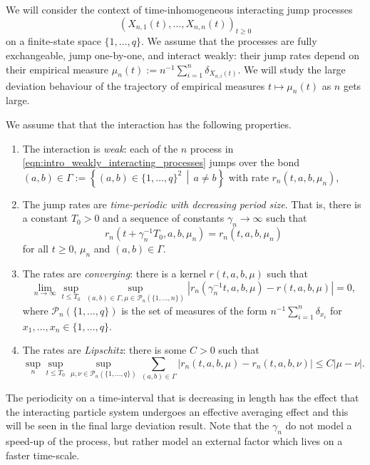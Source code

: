 \documentclass[a4paper]{article}
\newcommand{\cP}{\mathcal{P}}
\numberwithin{equation}{section}
\theoremstyle{definition}
\begin{document}
We will consider the context of time-inhomogeneous interacting jump processes 
\begin{equation} \label{eqn:intro_weakly_interacting_processes}
	(X_{n,1}(t),\dots,X_{n,n}(t))_{t \geq 0}
\end{equation} 
on a finite-state space $\{1,\dots,q\}$. We assume that the processes are fully exchangeable, jump one-by-one, and interact weakly: their jump rates depend on their empirical measure $\mu_n(t) := n^{-1} \sum_{i=1}^n \delta_{X_{n,i}(t)}$.  We will study the large deviation behaviour of the trajectory of empirical measures $t \mapsto \mu_n(t)$ as $n$ gets large.




We assume that that the interaction has the following properties.
\begin{enumerate}[(1)]
	\item \label{item:intro_weak_interaction}The interaction is \textit{weak}: each of the $n$ process in \eqref{eqn:intro_weakly_interacting_processes} jumps over the bond $(a,b) \in \Gamma := \left\{(a,b) \in \{1,\dots,q\}^2 \, \middle| \, a \neq b\right\}$ with rate $r_n(t,a,b,\mu_n)$,
	\item \label{item:intro_time_periodic} The jump rates are \textit{time-periodic with decreasing period size}. That is, there is a constant $T_0 > 0$ and a sequence of constants $\gamma_n \rightarrow \infty$ such that 
	\begin{equation*}
		r_n(t + \gamma_n^{-1}T_0,a,b,\mu_n) = r_n(t,a,b,\mu_n)
	\end{equation*}
	for all $t \geq 0$, $\mu_n$ and $(a,b) \in \Gamma$. 
	\item \label{item:intro_convergence} The rates are \textit{converging}: there is a kernel $r(t,a,b,\mu)$ such that 
	\begin{equation*}
		\lim_{n \rightarrow \infty} \sup_{t \leq T_0} \sup_{(a,b) \in \Gamma, \mu \in \cP_n(\{1,\dots,n\})} \left|r_n(\gamma_n^{-1}t, a,b,\mu) - r(t,a,b,\mu) \right| = 0,
	\end{equation*}
	where $\cP_n(\{1,\dots,q\})$ is the set of measures of the form $n^{-1} \sum_{i = 1}^n \delta_{x_i}$ for $x_1,\dots,x_n \in \{1,\dots,q\}$.
	\item \label{item:intro_Lipschitz} The rates are \textit{Lipschitz}: there is some $C > 0$ such that 
	\begin{equation*}
		\sup_n \sup_{t \leq T_0} \sup_{\mu,\nu \in \cP_n(\{1,\dots,q\})} \sum_{(a,b) \in \Gamma} \left|r_n(t,a,b,\mu) - r_n(t,a,b,\nu)\right| \leq C\left|\mu - \nu \right|.
	\end{equation*}
\end{enumerate}
The periodicity on a time-interval that is decreasing in length has the effect that the interacting particle system undergoes an effective averaging effect and this will be seen in the final large deviation result. Note that the $\gamma_n$ do not model a speed-up of the process, but rather model an external factor which lives on a faster time-scale.
\end{document}

